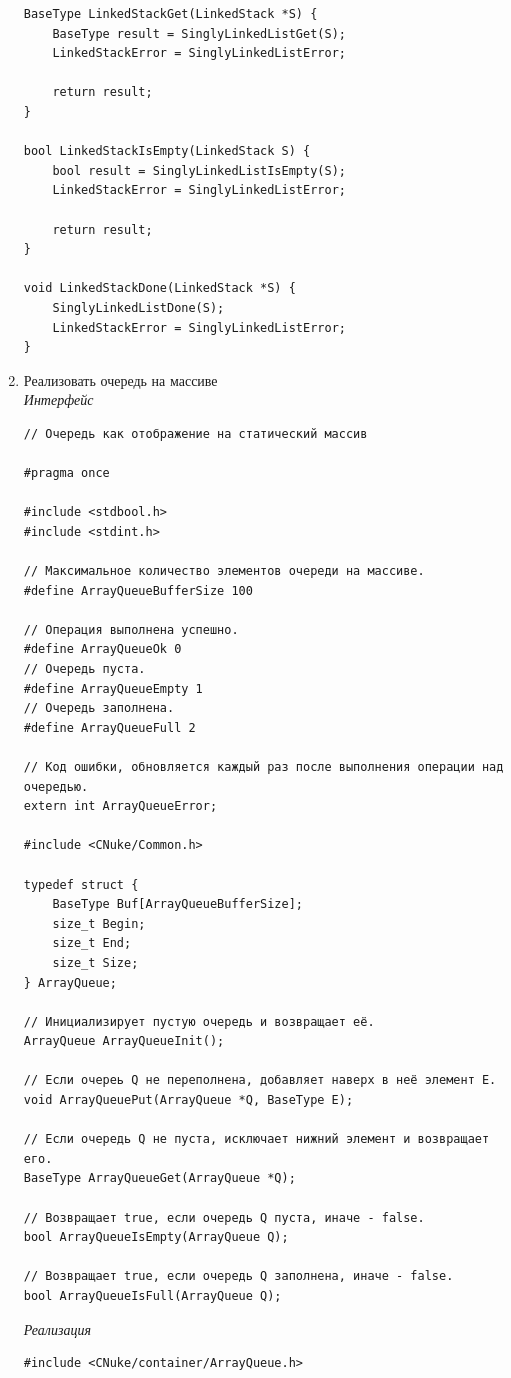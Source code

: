 \documentclass[a4paper,14pt]{extarticle}
\begin{document}
\begin{enumerate}
\begin{verbatim}
BaseType LinkedStackGet(LinkedStack *S) {
    BaseType result = SinglyLinkedListGet(S);
    LinkedStackError = SinglyLinkedListError;

    return result;
}

bool LinkedStackIsEmpty(LinkedStack S) {
    bool result = SinglyLinkedListIsEmpty(S);
    LinkedStackError = SinglyLinkedListError;

    return result;
}

void LinkedStackDone(LinkedStack *S) {
    SinglyLinkedListDone(S);
    LinkedStackError = SinglyLinkedListError;
}
    \end{verbatim}
    \item Реализовать очередь на массиве\\
	\textit{Интерфейс}
    \begin{verbatim}
// Очередь как отображение на статический массив

#pragma once

#include <stdbool.h>
#include <stdint.h>

// Максимальное количество элементов очереди на массиве.
#define ArrayQueueBufferSize 100

// Операция выполнена успешно.
#define ArrayQueueOk 0
// Очередь пуста.
#define ArrayQueueEmpty 1
// Очередь заполнена.
#define ArrayQueueFull 2

// Код ошибки, обновляется каждый раз после выполнения операции над очередью.
extern int ArrayQueueError;

#include <CNuke/Common.h>

typedef struct {
    BaseType Buf[ArrayQueueBufferSize];
    size_t Begin;
    size_t End;
    size_t Size;
} ArrayQueue;

// Инициализирует пустую очередь и возвращает её.
ArrayQueue ArrayQueueInit();

// Если очереь Q не переполнена, добавляет наверх в неё элемент E.
void ArrayQueuePut(ArrayQueue *Q, BaseType E);

// Если очередь Q не пуста, исключает нижний элемент и возвращает его.
BaseType ArrayQueueGet(ArrayQueue *Q);

// Возвращает true, если очередь Q пуста, иначе - false.
bool ArrayQueueIsEmpty(ArrayQueue Q);

// Возвращает true, если очередь Q заполнена, иначе - false.
bool ArrayQueueIsFull(ArrayQueue Q);
    \end{verbatim}
    \textit{Реализация}
\begin{verbatim}
#include <CNuke/container/ArrayQueue.h>


\end{verbatim}
\end{enumerate}
\end{document}
